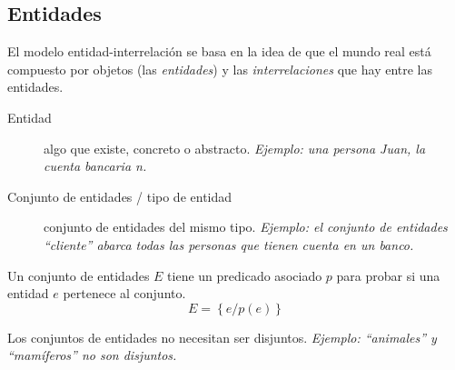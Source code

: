 \documentclass[a4paper, twoside]{article}
\begin{document}
\subsection{Entidades}
El modelo entidad-interrelación se basa en la idea de que el mundo real está compuesto por objetos (las \emph{entidades}) y las \emph{interrelaciones} que hay entre las entidades.

\begin{description}
	\item[Entidad] algo que existe, concreto o abstracto. \emph{Ejemplo: una persona Juan, la cuenta bancaria n.}
	\item[Conjunto de entidades / tipo de entidad] conjunto de entidades del mismo tipo. \emph{Ejemplo: el conjunto de entidades ``cliente'' abarca todas las personas que tienen cuenta en un banco.}
\end{description}

Un conjunto de entidades $E$ tiene un predicado asociado $p$ para probar si una entidad $e$ pertenece al conjunto.
\[
	E = \left\{ e/p(e)\right\} 
\]

Los conjuntos de entidades no necesitan ser disjuntos. \emph{Ejemplo: ``animales'' y ``mamíferos'' no son disjuntos.}
\end{document}
